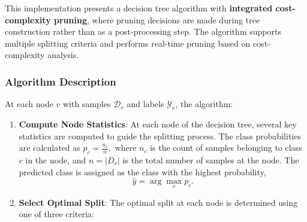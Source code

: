 This implementation presents a decision tree algorithm with \textbf{integrated cost-complexity pruning}, where pruning decisions are made during tree construction rather than as a post-processing step. The algorithm supports multiple splitting criteria and performs real-time pruning based on cost-complexity analysis.

\subsubsection{Algorithm Description}\label{algorithm-description}

At each node \(v\) with samples \(\mathcal{D}_v\) and labels \(\mathcal{Y}_v\), the algorithm:

\begin{enumerate}
\def\labelenumi{\arabic{enumi}.}
\item
  \textbf{Compute Node Statistics}: At each node of the decision tree, several key statistics are computed to guide the splitting process. The class probabilities are calculated as \(p_c = \frac{n_c}{n},\) where \(n_c\) is the count of samples belonging to class \(c\) in the node, and \(n = |D_v|\) is the total number of samples at the node. The predicted class is assigned as the class with the highest probability, \[\hat{y} = \arg\max_c p_c.\]
\item
  \textbf{Select Optimal Split}: The optimal split at each node is determined using one of three criteria:


\end{enumerate}
